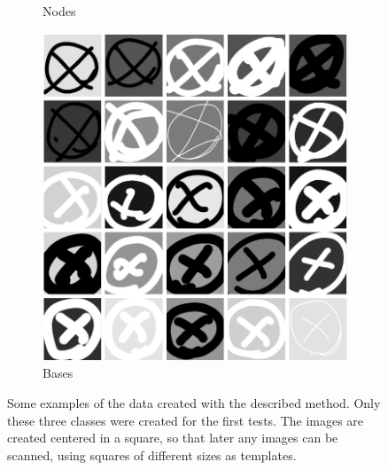 \begin{figure}
\begin{subfigure}[b]{0.3\textwidth}
        \caption{Nodes}
        \label{fig:25_links}
    \end{subfigure}
    \begin{subfigure}[b]{0.3\textwidth}
        \includegraphics[width=\textwidth]{images/25_x.png}
        \caption{Bases}
        \label{fig:25_bases}
    \end{subfigure}
    \caption[Examples of node data for training]{Some examples of the data created with the described method. Only these three classes were created for the first tests. The images are created centered in a square, so that later any images can be scanned, using squares of different sizes as templates. }
    \label{fig:generated_data_samples}
\end{figure}
